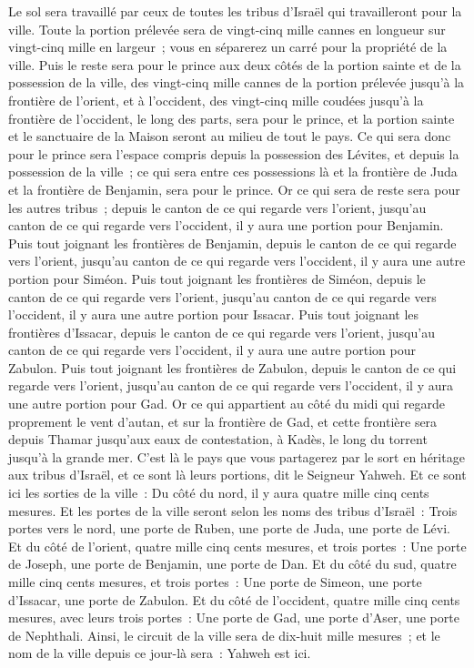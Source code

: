 \begin{multicols}{2}
Le sol sera travaillé par ceux de toutes les tribus d'Israël qui travailleront pour la ville.
Toute la portion prélevée sera de vingt-cinq mille cannes en longueur sur vingt-cinq mille en largeur~; vous en séparerez un carré pour la propriété de la ville.
Puis le reste sera pour le prince aux deux côtés de la portion sainte et de la possession de la ville, des vingt-cinq mille cannes de la portion prélevée jusqu'à la frontière de l'orient, et à l'occident, des vingt-cinq mille coudées jusqu'à la frontière de l'occident, le long des parts, sera pour le prince, et la portion sainte et le sanctuaire de la Maison seront au milieu de tout le pays. 
Ce qui sera donc pour le prince sera l'espace compris depuis la possession des Lévites, et depuis la possession de la ville~; ce qui sera entre ces possessions là et la frontière de Juda et la frontière de Benjamin, sera pour le prince.
Or ce qui sera de reste sera pour les autres tribus~; depuis le canton de ce qui regarde vers l'orient, jusqu'au canton de ce qui regarde vers l'occident, il y aura une portion pour Benjamin.
Puis tout joignant les frontières de Benjamin, depuis le canton de ce qui regarde vers l'orient, jusqu'au canton de ce qui regarde vers l'occident, il y aura une autre portion pour Siméon.
Puis tout joignant les frontières de Siméon, depuis le canton de ce qui regarde vers l'orient, jusqu'au canton de ce qui regarde vers l'occident, il y aura une autre portion pour Issacar.
Puis tout joignant les frontières d'Issacar, depuis le canton de ce qui regarde vers l'orient, jusqu'au canton de ce qui regarde vers l'occident, il y aura une autre portion pour Zabulon.
Puis tout joignant les frontières de Zabulon, depuis le canton de ce qui regarde vers l'orient, jusqu'au canton de ce qui regarde vers l'occident, il y aura une autre portion pour Gad.
Or ce qui appartient au côté du midi qui regarde proprement le vent d'autan, et sur la frontière de Gad, et cette frontière sera depuis Thamar jusqu'aux eaux de contestation, à Kadès, le long du torrent jusqu'à la grande mer.
C'est là le pays que vous partagerez par le sort en héritage aux tribus d'Israël, et ce sont là leurs portions, dit le Seigneur Yahweh.
Et ce sont ici les sorties de la ville~: Du côté du nord, il y aura quatre mille cinq cents mesures.
Et les portes de la ville seront selon les noms des tribus d'Israël~: Trois portes vers le nord, une porte de Ruben, une porte de Juda, une porte de Lévi.
Et du côté de l'orient, quatre mille cinq cents mesures, et trois portes~: Une porte de Joseph, une porte de Benjamin, une porte de Dan.
Et du côté du sud, quatre mille cinq cents mesures, et trois portes~: Une porte de Simeon, une porte d'Issacar, une porte de Zabulon.
Et du côté de l'occident, quatre mille cinq cents mesures, avec leurs trois portes~: Une porte de Gad, une porte d'Aser, une porte de Nephthali.
Ainsi, le circuit de la ville sera de dix-huit mille mesures~; et le nom de la ville depuis ce jour-là sera~: Yahweh est ici.
\PPE{}
\end{multicols}
